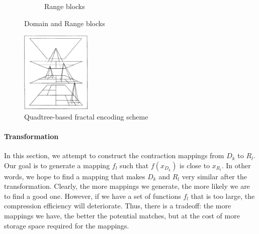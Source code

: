 \documentclass{article}
\begin{document}
\begin{figure}[ht]
\begin{subfigure}[b]{0.45\textwidth}
        \caption{Range blocks}
    \end{subfigure}
    \caption{Domain and Range blocks}
    \label{fig:blocks}
\end{figure}

\begin{figure}[ht]
    \centering
    \includegraphics[width=0.3\textwidth]{pic3}
    \caption{Quadtree-based fractal encoding scheme}
    \label{fig:quadtree}
\end{figure}

\paragraph{Transformation}
In this section, we attempt to construct the contraction mappings from \( D_k \) to \( R_l \). Our goal is to generate a mapping \( f_l \) such that \( f(x_{D_k}) \) is close to \( x_{R_l} \). In other words, we hope to find a mapping that makes \( D_k \) and \( R_l \) very similar after the transformation. Clearly, the more mappings we generate, the more likely we are to find a good one. However, if we have a set of functions \( f_l \) that is too large, the compression efficiency will deteriorate. Thus, there is a tradeoff: the more mappings we have, the better the potential matches, but at the cost of more storage space required for the mappings.
\end{document}
